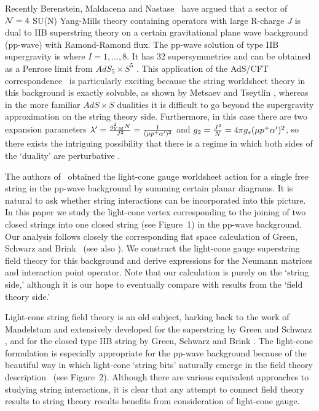 Recently Berenstein, Maldacena and Nastase \BMN\ have argued that
a sector of ${\cal{N}}=4$ SU(N) Yang-Mills theory
containing operators
with large R-charge $J$
is dual to IIB superstring theory on a certain
gravitational plane wave background (pp-wave) with Ramond-Ramond flux.
The pp-wave solution of type IIB supergravity is
\BlauNE
\eqn{}
where $I=1,\ldots,8.$
It has 32 supersymmetries and can be obtained as
a Penrose limit from $AdS_5 \times S^5$ .
This application of the AdS/CFT correspondence \MaldacenaRE\ 
is particularly exciting
because the string worldsheet theory in this background
is exactly solvable, as shown by Metsaev and Tseytlin
,
whereas in the more familiar
$AdS \times S$  dualities it is difficult to go beyond
the supergravity approximation on the string theory side.
Furthermore, in this case there are two expansion parameters 
$\lambda'={g^2_{YM} N \over J^2}={1 \over (\mu p^+ \alpha')^2}$
and $g_2={J^2 \over N}=4 \pi g_s (\mu p^+ \alpha')^2$,
so there exists the intriguing possibility that there is a regime
in which both sides of the `duality' are perturbative \seven.

The authors of \BMN\ obtained the light-cone gauge
worldsheet action for a single free
string in the pp-wave background by 
summing certain planar diagrams.
It is natural to ask whether
string interactions can be incorporated into this picture.
In this paper we study the light-cone
vertex
corresponding to the
joining of two closed strings into one closed string (see Figure~1)
in the pp-wave background.
Our analysis follows closely the corresponding flat space calculation
of Green, Schwarz and Brink \GSB\ (see also \GSW).
We construct the light-cone gauge superstring field theory for this
background and derive expressions for the Neumann matrices and 
interaction point operator.
Note that our calculation is purely on the `string side,' although
it is our hope to eventually compare with results from  the
`field theory side.'


Light-cone string field theory is an old subject, harking back
to the work of Mandelstam 
and extensively developed for the superstring
by Green and Schwarz , and
for the closed type IIB string by Green, Schwarz
and Brink \GSB.  The light-cone formulation is especially appropriate
for the pp-wave background because of the beautiful way in which
light-cone `string bits' naturally emerge in the field
theory description \BMN\ (see Figure~2).
Although there are various equivalent approaches to studying
string interactions, it is clear that any attempt to connect
field theory results to string theory results benefits from
consideration of light-cone gauge.

